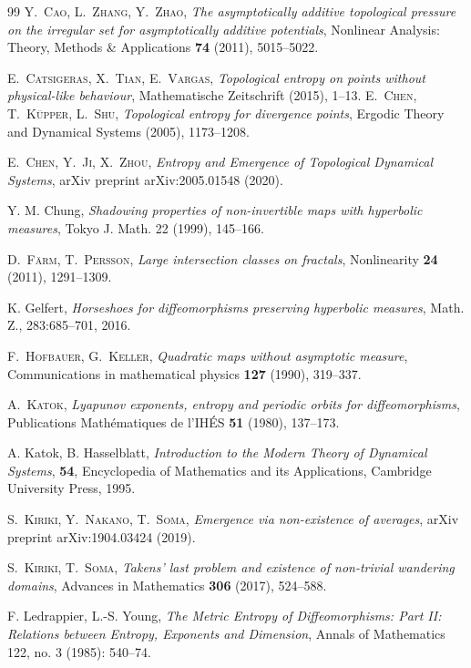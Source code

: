 \documentclass{amsart}
\theoremstyle{plain}
\theoremstyle{definition}
\theoremstyle{remark}
\numberwithin{equation}{section}
\begin{document}
\begin{thebibliography}{99}
\textsc{Y.~Cao, L.~Zhang, Y.~Zhao},
\textit{The asymptotically additive topological pressure on the irregular set for asymptotically additive potentials},
Nonlinear Analysis: Theory, Methods \& Applications
\textbf{74} (2011), 
5015--5022.

\textsc{E.~Catsigeras, X.~Tian, E.~Vargas},
\textit{Topological entropy on points without physical-like behaviour},
Mathematische Zeitschrift
(2015), 
1--13.
%
\textsc{E.~Chen, T.~K{\"u}pper, L.~Shu},
\textit{Topological entropy for divergence points},
Ergodic Theory and Dynamical Systems
(2005),
1173--1208.


\textsc{E.~Chen, Y.~Ji, X.~Zhou},
\textit{Entropy and Emergence of Topological Dynamical
Systems},
arXiv preprint arXiv:2005.01548
(2020).

Y. M. Chung, \emph{Shadowing properties of non-invertible maps with hyperbolic measures},
Tokyo J. Math. 22 (1999), 145–166.



\textsc{D.~F{\"a}rm, T.~Persson},
\textit{Large intersection classes on fractals},
Nonlinearity
\textbf{24} (2011),
1291--1309.

K. Gelfert, \emph{Horseshoes for diffeomorphisms preserving hyperbolic measures}, Math. Z., 283:685–701, 2016.

\textsc{F.~Hofbauer, G.~Keller},
\textit{Quadratic maps without asymptotic measure},
Communications in mathematical physics
\textbf{127} (1990), 
319--337.
 
 
\textsc{A.~Katok},
\textit{Lyapunov exponents, entropy and periodic orbits for diffeomorphisms},
Publications Math{\'e}matiques de l'IH{\'E}S
\textbf{51} (1980),
137--173.
%
%
%


A. Katok, B. Hasselblatt, \emph{Introduction to the Modern Theory of Dynamical Systems}, {\bf 54}, Encyclopedia of Mathematics and its Applications, Cambridge University Press, 1995.


      \textsc{S.~Kiriki, Y.~Nakano, T.~Soma},
      \textit{Emergence via non-existence of averages},
arXiv preprint arXiv:1904.03424
  (2019).


%
\textsc{S.~Kiriki, T.~Soma},
\textit{Takens' last problem and existence of non-trivial wandering domains},
Advances in Mathematics
\textbf{306} (2017), 
524--588.


F. Ledrappier, L.-S. Young, \emph{The Metric Entropy of Diffeomorphisms: Part II: Relations between Entropy, Exponents and Dimension}, Annals of Mathematics 122, no. 3 (1985): 540–74. 



\end{thebibliography}
\end{document}
